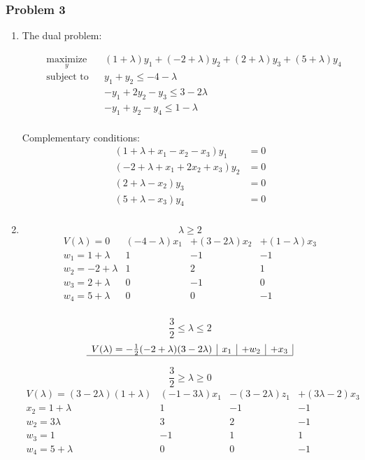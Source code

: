 \documentclass[12pt]{article}
\newcommand{\Q}[1]{\subsubsection*{Problem #1}}
\begin{document}
\Q{3}
\begin{enumerate}
\item The dual problem:

  \begin{equation*}
    \begin{aligned}
      & \underset{y}{\text{maximize}}
      & & (1+\lambda)y_1 + (-2+\lambda)y_2 + (2 + \lambda)y_3 + (5+\lambda)y_4 \\
      & \text{subject to}
      & & y_1 + y_2 \le -4 -\lambda \\
      & & & -y_1 + 2y_2  - y_3 \le 3 - 2\lambda \\
      & & & -y_1 + y_2  - y_4 \le 1 - \lambda \\
    \end{aligned}
  \end{equation*}

  Complementary conditions:
  \begin{align*}
    (1 + \lambda + x_1 - x_2 - x_3)y_1 &= 0 \\
    (-2 + \lambda + x_1 + 2x_2 + x_3)y_2 &= 0 \\
    (2 + \lambda - x_2)y_3 &= 0 \\
    (5 + \lambda - x_3)y_4 &= 0 \\
  \end{align*}

\item
  $$\lambda \ge 2$$
  \[
    \begin{array}{c|c|c|c|c}
      V(\lambda) = 0 & (-4-\lambda) x_1 &+ (3-2\lambda)x_2 &+ (1-\lambda)x_3\\
      \hline
      w_1 = 1+\lambda      & 1          & -1         &-1        \\
      w_2 =-2+\lambda      & 1          &  2         & 1        \\
      w_3 = 2+\lambda      & 0          &  -1        & 0        \\
      w_4 = 5+\lambda      & 0          &  0         & -1       \\
    \end{array}
  \]
  
  $$\frac{3}{2} \le\lambda \le 2$$
  \[
    \begin{array}{c|c|c|c|c}
      V(\lambda) = -\frac12 (-2+\lambda)(3-2\lambda) &  x_1 &+ w_2 &+ x_3\\
      \hline
    \end{array}
  \]

  $$ \frac32 \ge \lambda \ge 0$$
  \[
    \begin{array}{l|c|c|c|c}
      V(\lambda) = (3-2\lambda)(1+\lambda) & (-1-3\lambda) x_1 &- (3-2\lambda)z_1 &+ (3\lambda-2)x_3\\
      \hline
      x_2 = 1+\lambda         & 1          &  -1        &-1        \\
      w_2 = 3\lambda          & 3          &  2         & -1        \\
      w_3 = 1           & -1          & 1         & 1        \\
      w_4 = 5+\lambda         & 0          &  0         & -1       \\
    \end{array}
  \]


\end{enumerate}
\end{document}
